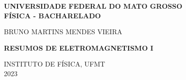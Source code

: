 \titlepage

\begin{titlepage}

\begin{center}
       
        \textbf{UNIVERSIDADE FEDERAL DO MATO GROSSO}\\
       
        \textbf{FÍSICA - BACHARELADO}
       
    \vspace*{3cm}

        {BRUNO MARTINS MENDES VIEIRA}

    \vfill
        
        \large{\textbf{RESUMOS DE ELETROMAGNETISMO I}}
        
    \vfill

    \vfill
    
        INSTITUTO DE FÍSICA, UFMT\\
       
        2023
            
\end{center}


\end{titlepage}

\newpage